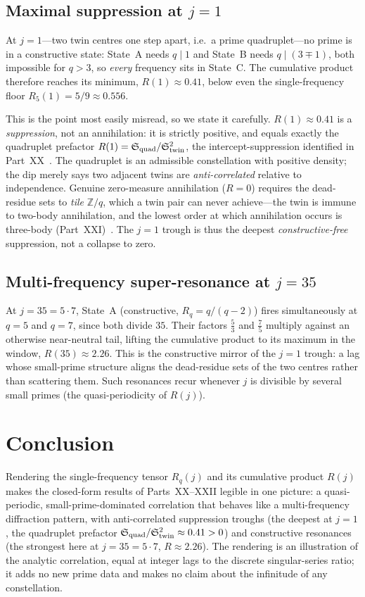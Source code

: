 \documentclass[11pt,a4paper]{article}
\begin{document}
\subsection{Maximal suppression at $j=1$}
At $j=1$---two twin centres one step apart, i.e.\ a prime quadruplet---no prime is
in a constructive state: State~A needs $q\mid1$ and State~B needs $q\mid(3\mp1)$,
both impossible for $q>3$, so \emph{every} frequency sits in State~C. The
cumulative product therefore reaches its minimum, $R(1)\approx0.41$, below even the
single-frequency floor $R_5(1)=5/9\approx0.556$.

This is the point most easily misread, so we state it carefully. $R(1)\approx0.41$
is a \emph{suppression}, not an annihilation: it is strictly positive, and equals
exactly the quadruplet prefactor
$R(1)=\mathfrak{S}_{\rm quad}/\mathfrak{S}_{\rm twin}^2$, the intercept-suppression
identified in Part~XX~\cite{ChenXX}. The quadruplet is an admissible constellation
with positive density; the dip merely says two adjacent twins are
\emph{anti-correlated} relative to independence. Genuine zero-measure annihilation
($R=0$) requires the dead-residue sets to \emph{tile} $\mathbb{Z}/q$, which a
twin pair can never achieve---the twin is immune to two-body annihilation, and the
lowest order at which annihilation occurs is three-body (Part~XXI)~\cite{ChenXXI}.
The $j=1$ trough is thus the deepest \emph{constructive-free} suppression, not a
collapse to zero.

\subsection{Multi-frequency super-resonance at $j=35$}
At $j=35=5\cdot7$, State~A (constructive, $R_q=q/(q-2)$) fires simultaneously at
$q=5$ and $q=7$, since both divide $35$. Their factors $\tfrac53$ and $\tfrac75$
multiply against an otherwise near-neutral tail, lifting the cumulative product to
its maximum in the window, $R(35)\approx2.26$. This is the constructive mirror of
the $j=1$ trough: a lag whose small-prime structure aligns the dead-residue sets
of the two centres rather than scattering them. Such resonances recur whenever $j$
is divisible by several small primes (the quasi-periodicity of $R(j)$).

\section{Conclusion}
Rendering the single-frequency tensor $R_q(j)$ and its cumulative product $R(j)$
makes the closed-form results of Parts~XX--XXII legible in one picture: a
quasi-periodic, small-prime-dominated correlation that behaves like a
multi-frequency diffraction pattern, with anti-correlated suppression troughs (the
deepest at $j=1$, the quadruplet prefactor $\mathfrak{S}_{\rm quad}/
\mathfrak{S}_{\rm twin}^2\approx0.41>0$) and constructive resonances (the strongest
here at $j=35=5\cdot7$, $R\approx2.26$). The rendering is an illustration of the
analytic correlation, equal at integer lags to the discrete singular-series ratio;
it adds no new prime data and makes no claim about the infinitude of any
constellation.
\end{document}
